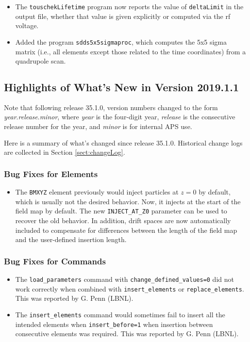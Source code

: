 \documentclass[11pt]{article}
\begin{document}
\begin{itemize}
\item The \verb|touschekLifetime| program now reports the value of \verb|deltaLimit| in the output file, whether that
  value is given explicitly or computed via the rf voltage.
\item Added the program \verb|sdds5x5sigmaproc|, which computes the 5x5 sigma matrix (i.e., all elements except those
  related to the time coordinates) from a quadrupole scan.
\end{itemize}


\subsection{Highlights of What's New in Version 2019.1.1}

Note that following release 35.1.0, version numbers changed to the form {\em year}.{\em release}.{\em minor},
where {\em year} is the four-digit year, {\em release} is the consecutive release number for the year,
and {\em minor} is for internal APS use.

Here is a summary of what's changed since release 35.1.0.
Historical change logs are collected in Section \ref{sect:changeLog}.

\subsubsection{Bug Fixes for Elements}

\begin{itemize}
\item The \verb|BMXYZ| element previously would inject particles at $z=0$ by default, which is usually not
  the desired behavior. Now, it injects at the start of the field map by default. The new \verb|INJECT_AT_Z0|
  parameter can be used to recover the old behavior. In addition, drift spaces are now automatically included
  to compensate for differences between the length of the field map and the user-defined insertion length.
\end{itemize}

\subsubsection{Bug Fixes for Commands}
\begin{itemize}
\item The \verb|load_parameters| command with \verb|change_defined_values=0| 
  did not work correctly when combined with \verb|insert_elements| or \verb|replace_elements|.
  This was reported by G. Penn (LBNL).
\item The \verb|insert_elements| command would sometimes fail to insert all the intended elements when 
  \verb|insert_before=1| when insertion between consecutive elements was required.
  This was reported by G. Penn (LBNL).
\end{itemize}
\end{document}
